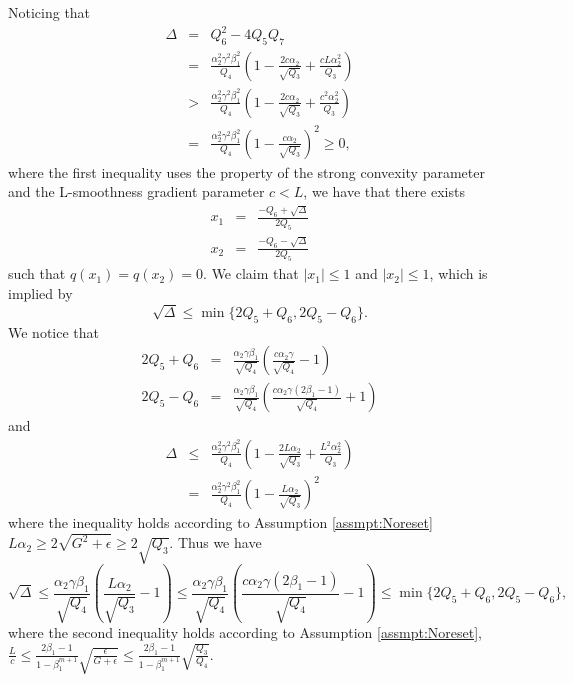 \documentclass[twoside]{article}
\begin{document}
Noticing that 
\begin{eqnarray}
\Delta &=& Q_6^2 - 4Q_5Q_7\nonumber\\
&=& \frac{\alpha_2^2\gamma^2\beta_1^2}{Q_4}\left(1 - \frac{2c\alpha_2}{\sqrt{Q_3}} + \frac{cL\alpha_2^2}{Q_3}\right)\nonumber\\
&>& \frac{\alpha_2^2\gamma^2 \beta_1^2}{Q_4}\left(1 - \frac{2c\alpha_2}{\sqrt{Q_3}} + \frac{c^2\alpha_2^2}{Q_3}\right)\nonumber\\
&=&\frac{\alpha_2^2\gamma^2 \beta_1^2}{Q_4}\left(1-\frac{c\alpha_2}{\sqrt{Q_3}}\right)^2\geq 0, \nonumber
\end{eqnarray}
where the first inequality uses the property of the strong convexity parameter and the L-smoothness gradient parameter $c<L$, we have that there exists 
\begin{eqnarray}
x_1 &=& \frac{-Q_6 + \sqrt{\Delta}}{2Q_5}\nonumber\\
x_2 &=& \frac{-Q_6 - \sqrt{\Delta}}{2Q_5} \nonumber
\end{eqnarray}
such that $q(x_1)=q(x_2)=0$. We claim that $|x_1|\leq 1$ and $|x_2|\leq 1$, which is implied by
\begin{equation}
\label{BdSqrtDelta}
\sqrt{\Delta} \leq \min\{ 2Q_5 + Q_6, 2Q_5 - Q_6\}.
\end{equation}
We notice that
\begin{eqnarray}
2Q_5 + Q_6 &=& \frac{\alpha_2 \gamma \beta_1}{\sqrt{Q_4}}\left( \frac{c
\alpha_2 \gamma}{\sqrt{Q_4}} -1\right)\nonumber\\
2Q_5 - Q_6 &=&  \frac{\alpha_2 \gamma \beta_1}{\sqrt{Q_4}}
\left(\frac{c\alpha_2\gamma(2\beta_1-1)}{\sqrt{Q_4}} +1\right)\nonumber
\end{eqnarray}
and
\begin{eqnarray}
\Delta &\leq& \frac{\alpha_2^2 \gamma^2 \beta_1^2}{Q_4}\left(1 - \frac{2L\alpha_2}{\sqrt{Q_3}} + \frac{L^2 \alpha_2^2}{Q_3}\right)\nonumber\\
&=& \frac{\alpha_2^2 \gamma^2 \beta_1^2}{Q_4}\left(1-\frac{L\alpha_2}{\sqrt{Q_3}}\right)^2\nonumber
\end{eqnarray}
where the inequality holds according to Assumption \ref{assmpt:Noreset} 
$
    L\alpha_2 \geq 2\sqrt{G^2 + \epsilon} \geq 2 \sqrt{Q_3}.
$
Thus we have
\begin{equation*}
    \sqrt{\Delta} \leq \frac{\alpha_2\gamma\beta_1}{\sqrt{Q_4}} \left(\frac{L\alpha_2}{\sqrt{Q_3}} - 1\right)
    \leq \frac{\alpha_2\gamma\beta_1}{\sqrt{Q_4}} \left(\frac{c\alpha_2\gamma(2\beta_1-1)}{\sqrt{Q_4}} - 1\right)
    \leq \min\{2Q_5+Q_6, 2Q_5 - Q_6\},
\end{equation*}
where the second inequality holds according to Assumption \ref{assmpt:Noreset}, $
\frac{L}{c} \leq \frac{2\beta_1-1}{1-\beta_1^{m+1}} \sqrt{\frac{\epsilon}{G+\epsilon}} \leq \frac{2\beta_1-1}{1-\beta_1^{m+1}} \sqrt{\frac{Q_3}{Q_4}}$.
\end{document}
